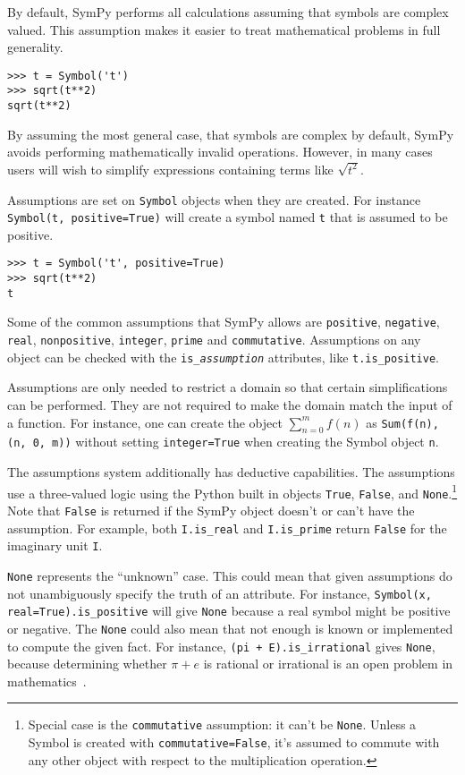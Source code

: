 By default, SymPy performs all calculations assuming that symbols are
complex valued. This assumption makes it easier to treat mathematical problems
in full generality.
\begin{verbatim}
>>> t = Symbol('t')
>>> sqrt(t**2)
sqrt(t**2)
\end{verbatim}

By assuming the most general case, that symbols are complex by default, SymPy
avoids performing mathematically invalid operations. However, in many cases
users will wish to simplify expressions containing terms like $\sqrt{t^2}$.

Assumptions are set on \texttt{Symbol} objects when they are created. For
instance \texttt{Symbol(\textquotesingle{}t\textquotesingle{}, positive=True)} will create a symbol named
\texttt{t} that is assumed to be positive.
\begin{verbatim}
>>> t = Symbol('t', positive=True)
>>> sqrt(t**2)
t
\end{verbatim}

Some of the common assumptions that SymPy allows are \texttt{positive},
\texttt{negative}, \texttt{real}, \texttt{nonpositive}, \texttt{integer},
\texttt{prime} and \texttt{commutative}. Assumptions on any object can
be checked with the \verb|is_|\texttt{\textit{assumption}} attributes,
like \verb|t.is_positive|.

Assumptions are only needed to restrict a domain so that certain
simplifications can be performed. They are not required to make the domain match
the input of a function. For instance, one can create the object
$\sum_{n=0}^m f(n)$ as \verb|Sum(f(n), (n, 0, m))| without setting
\texttt{integer=True} when creating the Symbol object \texttt{n}.

The assumptions system additionally has deductive capabilities. The
assumptions use a three-valued logic using the Python built in objects
\texttt{True}, \texttt{False}, and \texttt{None}.\footnote{Special
case is the \texttt{commutative} assumption: it can't be \texttt{None}.
Unless a Symbol is created with \texttt{commutative=False}, it's
assumed to commute with any other object with respect
to the multiplication operation.} Note that \texttt{False}
is returned if the SymPy object doesn't or can't have the assumption.
For example, both \texttt{I.is\_real} and \texttt{I.is\_prime} return
\texttt{False} for the imaginary unit \texttt{I}.

\texttt{None} represents the
``unknown'' case. This could mean that given assumptions do not unambiguously
specify the truth of an attribute. For instance,
\texttt{Symbol(\textquotesingle{}x\textquotesingle{}, real=True).is\_positive}
will give \texttt{None} because a real symbol might be positive or negative.
The \texttt{None} could also mean that not enough is known or implemented to
compute the given fact. For instance, \texttt{(pi + E).is\_irrational} gives
\texttt{None}, because determining whether $\pi + e$ is rational or irrational
is an open problem in mathematics~\cite{lang1966introduction}.

